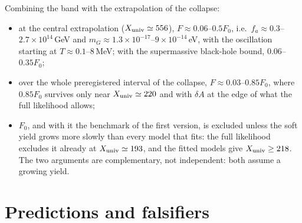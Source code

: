 \documentclass[11pt,a4paper]{article}
\newcommand{\dA}{\delta A}
\newcommand{\Xu}{X_{\rm univ}}
\begin{document}
Combining the band with the extrapolation of the collapse:
\begin{itemize}
\item at the central extrapolation ($\Xu\simeq556$), $F\approx0.06$--$0.5F_0$, i.e.\ $f_a\approx0.3$--$2.7\times10^{14}$\,GeV and $m_G\approx1.3\times10^{-17}$--$9\times10^{-14}$\,eV, with the oscillation starting at $T\approx0.1$--$8$\,MeV; with the supermassive black-hole bound, $0.06$--$0.35F_0$;
\item over the whole preregistered interval of the collapse, $F\approx0.03$--$0.85F_0$, where $0.85F_0$ survives only near $\Xu\simeq220$ and with $\dA$ at the edge of what the full likelihood allows;
\item $F_0$, and with it the benchmark of the first version, is excluded unless the soft yield grows more slowly than every model that fits: the full likelihood excludes it already at $\Xu\simeq193$, and the fitted models give $\Xu\ge218$. The two arguments are complementary, not independent: both assume a growing yield.
\end{itemize}

\section{Predictions and falsifiers}
\label{sec:predictions}
\end{document}
